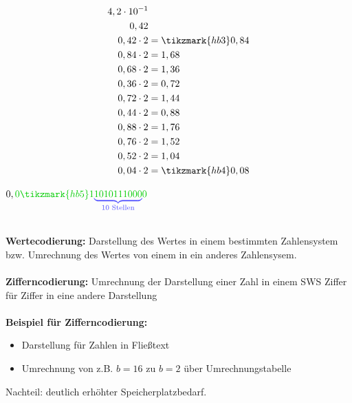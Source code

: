 \documentclass[10pt,a4paper]{scrartcl}
\begin{document}
\begin{minipage}{0.4\textwidth}
	\begin{align*}
4,2 \cdot 10^{-1} &\\
0,42 &\\
0,42 \cdot 2 &= \tikzmark{hb3}0,84\\
0,84 \cdot 2 &= 1,68\\
0,68 \cdot 2 &= 1,36\\
0,36 \cdot 2 &= 0,72\\
0,72 \cdot 2 &= 1,44\\
0,44 \cdot 2 &= 0,88\\
0,88 \cdot 2 &= 1,76\\
0,76 \cdot 2 &= 1,52\\
0,52 \cdot 2 &= 1,04\\
0,04 \cdot 2 &=  \tikzmark{hb4}0,08
\end{align*}
\end{minipage}
\begin{minipage}{0.4\textwidth}
	$ 0,\textcolor{green!80!black}{0\tikzmark{hb5}1\textcolor{blue!70}{\underbrace{\textcolor{green!80!black}{1010111000}}_{\text{10 Stellen}}}0} $
\end{minipage}

\\

\noindent
\textbf{Wertecodierung: }Darstellung des Wertes in einem bestimmten Zahlensystem bzw. Umrechnung des Wertes von einem in ein anderes Zahlensysem.\\
\\
\textbf{Zifferncodierung:} Umrechnung der Darstellung einer Zahl in einem \ac{SWS} Ziffer für Ziffer in eine andere Darstellung\\
\\
\textbf{Beispiel für Zifferncodierung:}\\
\begin{itemize}
	\item {} Darstellung für Zahlen in Fließtext
	\item Umrechnung von z.B. $ b=16 $ zu $ b=2 $ über Umrechnungstabelle
\end{itemize}
 Nachteil: deutlich erhöhter Speicherplatzbedarf.
\end{document}
